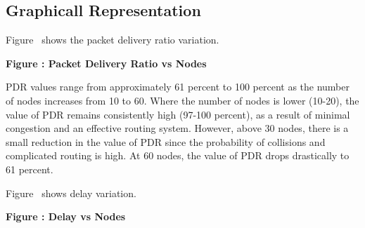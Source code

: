 \documentclass[a4paper,fleqn]{cas-dc}
\numberwithin{equation}{section}
\begin{document}
\subsection{Graphicall Representation}
\vspace{6pt}

\noindent Figure \thefigure\ shows the packet delivery ratio variation.

\begin{center}

\textbf{Figure \thefigure: Packet Delivery Ratio vs Nodes}
\label{fig:pdr_density}
\end{center}

PDR values range from approximately 61 percent to 100 percent as the number of nodes increases from 10 to 60. Where the number of nodes is lower (10-20), the value of PDR remains consistently high (97-100 percent), as a result of minimal congestion and an effective routing system. However, above 30 nodes, there is a small reduction in the value of PDR since the probability of collisions and complicated routing is high. At 60 nodes, the value of PDR drops drastically to 61 percent.

\vspace{0.5cm}

\noindent Figure \thefigure\ shows delay variation.

\begin{center}

\textbf{Figure \thefigure: Delay vs Nodes}
\label{fig:delay_density}
\end{center}
\end{document}
